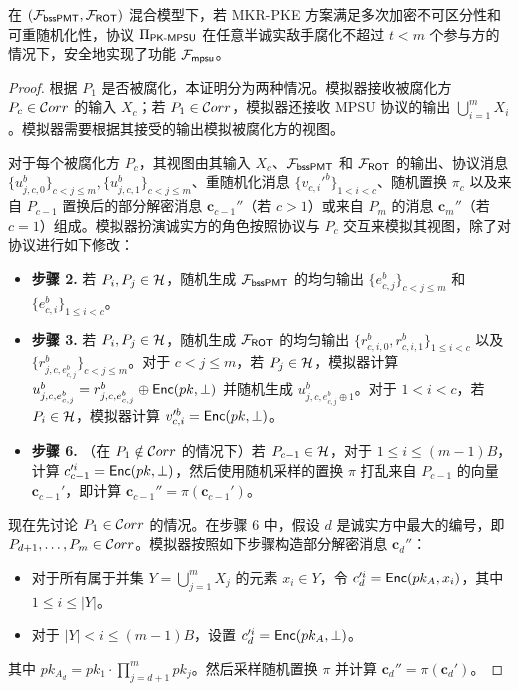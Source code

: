 \begin{theorem}\label{theorem:pke}
在 $(\mathcal{F}_\mathsf{bssPMT},\mathcal{F}_\mathsf{ROT})$ 混合模型下，若 MKR-PKE 方案满足多次加密不可区分性和可重随机化性，协议 $\Pi_\mathsf{PK\text{-}MPSU}$ 在任意半诚实敌手腐化不超过 $t < m$ 个参与方的情况下，安全地实现了功能 $\mathcal{F}_\mathsf{mpsu}$。
\end{theorem} 

\begin{proof}
根据 $P_1$ 是否被腐化，本证明分为两种情况。模拟器接收被腐化方 $P_c \in \mathcal{C}orr$ 的输入 $X_c$；若 $P_1 \in \mathcal{C}orr$，模拟器还接收 MPSU 协议的输出 $\bigcup_{i=1}^m X_i$。模拟器需要根据其接受的输出模拟被腐化方的视图。

对于每个被腐化方 $P_c$，其视图由其输入 $X_c$、$\mathcal{F}_\mathsf{bssPMT}$ 和 $\mathcal{F}_\mathsf{ROT}$ 的输出、协议消息 $\{u_{j,c,0}^b\}_{c < j \le m}, \{u_{j,c,1}^b\}_{c < j \le m}$、重随机化消息 $\{{v}_{c,i}'^b\}_{1 < i < c}$、随机置换 $\pi_c$ 以及来自 $P_{c-1}$ 置换后的部分解密消息 $\textbf{c}_{c-1}''$（若 $c>1$）或来自 $P_m$ 的消息 $\textbf{c}_{m}''$（若 $c=1$）组成。模拟器扮演诚实方的角色按照协议与 $P_c$ 交互来模拟其视图，除了对协议进行如下修改：
\begin{itemize}
    \item \textbf{步骤 2.} 若 $P_i, P_j \in \mathcal{H}$，随机生成 $\mathcal{F}_\mathsf{bssPMT}$ 的均匀输出 $\{e_{c,j}^b\}_{c < j \le m}$ 和 $\{e_{c,i}^b\}_{1 \le i < c}$。
    \item \textbf{步骤 3.} 若 $P_i, P_j \in \mathcal{H}$，随机生成 $\mathcal{F}_\mathsf{ROT}$ 的均匀输出 $\{r_{c,i,0}^b, r_{c,i,1}^b\}_{1 \le i < c}$ 以及 $\{r_{j,c,e_{c,j}^b}^b\}_{c < j \le m}$。对于 $c < j \le m$，若 $P_j \in \mathcal{H}$，模拟器计算 $u_{j,c,e_{c,j}^b}^b = r_{j,c,e_{c,j}^b}^b \oplus \mathsf{Enc}(pk, \perp)$ 并随机生成 $u_{j,c,e_{c,j}^b \oplus 1}^b$。对于 $1 < i < c$，若 $P_i \in \mathcal{H}$，模拟器计算 ${v}_{c,i}'^b = \mathsf{Enc}(pk, \perp)$。
    \item \textbf{步骤 6.} （在 $P_1 \notin \mathcal{C}orr$ 的情况下）若 $P_{c-1} \in \mathcal{H}$，对于 $1 \le i \le (m-1)B$，计算 ${c}_{c-1}'^i = \mathsf{Enc}(pk, \perp)$，然后使用随机采样的置换 $\pi$ 打乱来自 $P_{c-1}$ 的向量 $\textbf{c}_{c-1}'$，即计算 $\textbf{c}_{c-1}'' = {\pi}(\textbf{c}_{c-1}')$。
\end{itemize}

现在先讨论 $P_1 \in \mathcal{C}orr$ 的情况。在步骤 6 中，假设 $d$ 是诚实方中最大的编号，即 $P_{d+1}, \dots, P_m \in \mathcal{C}orr$。模拟器按照如下步骤构造部分解密消息 $\textbf{c}_{d}''$：
\begin{itemize}
    \item 对于所有属于并集 $Y = \bigcup_{j=1}^m X_j$ 的元素 $x_i \in Y$，令 ${c}_{d}'^i = \mathsf{Enc}(pk_{A}, x_i)$，其中 $1 \leq i \leq \lvert Y \rvert$。
    \item 对于 $\lvert Y \rvert <i \le (m-1)B$，设置 ${c}_{d}'^i = \mathsf{Enc}(pk_{A}, \perp)$。
\end{itemize}
其中 $pk_{A_d} = pk_1 \cdot \prod_{j= d+1}^m pk_j$。然后采样随机置换 $\pi$ 并计算 $\textbf{c}_{d}'' = \pi(\textbf{c}_{d}')$。


\end{proof}

